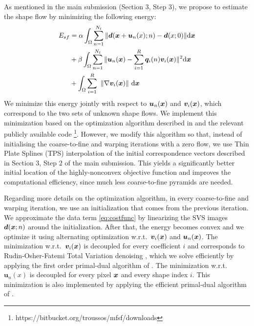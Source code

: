 As mentioned in the main submission (Section 3, Step 3), we propose to estimate the shape flow by minimizing the following energy:
\vspace{-5pt}
\begin{align}
E_{sf} & =\alpha
\int_{\Omega}\sum_{n=1}^{N_t} \|\bm{d}(\bx+\bm{u}_n(x);n)-\bm{d}(x;0)\| \ud \bx \label{eq:costfunc}\\
    &+ \beta \int_{\Omega}\sum_{n=1}^{N_t}\|\bm{u}_n(\bx)-\sum_{i=1}^R\bm{q}_i(n)\bm{v}_i(\bx)\|^2 \ud \bx \label{eq:lowrank}\\
    &+
\int_\Omega  \sum_{i=1}^R \,\, \left \|    \nabla \bm{v}_i(\bx)    \right \|  \,\ud \bx \label{eq:TVterm}
\vspace{-5pt}
\end{align}
We minimize this energy jointly with respect to $\bm{u}_n(\boldsymbol{x})$ and $\bm{v}_i(\boldsymbol{x})$, which correspond to the
two sets of unknown shape flows.
We implement this minimization based on the optimization algorithm described in \cite{Garg:2013hu} and the relevant publicly available code \footnote{https://bitbucket.org/troussos/mfsf/downloads}.
However, we modify this algorithm so that, instead of initialising the coarse-to-fine and warping iterations with a zero flow, we use Thin Plate Splines (TPS) \cite{Bookstein1989} interpolation of the initial correspondence vectors described in Section 3, Step 2 of the main submission.
This yields a significantly better initial location of the highly-nonconvex objective function and improves the computational efficiency, since much less coarse-to-fine pyramids are needed.

Regarding more details on the optimization algorithm, 
in every coarse-to-fine and warping iteration, we use an initialization that comes from the previous iteration. We approximate the data term \eqref{eq:costfunc} by linearizing the SVS images $\bm{d}(\boldsymbol{x};n)$ around the initialization. After that, the energy becomes convex and we optimize it using alternating optimization w.r.t.~$\bm{v}_i(\boldsymbol{x})$ and $\bm{u}_n(\boldsymbol{x})$. The minimization w.r.t.~$\bm{v}_i(\boldsymbol{x})$ is decoupled for every coefficient $i$ and corresponds to Rudin-Osher-Fatemi Total Variation denoising \cite{rudin92}, which we solve efficiently by applying the first order primal-dual algorithm of \cite{Chambolle:Pock:JMIV2011}. The minimization w.r.t.~$\bm{u}_n(x)$ is decoupled for every pixel $\boldsymbol{x}$ and every shape index $i$. This minimization is also implemented by applying the efficient primal-dual algorithm of \cite{Chambolle:Pock:JMIV2011}.




